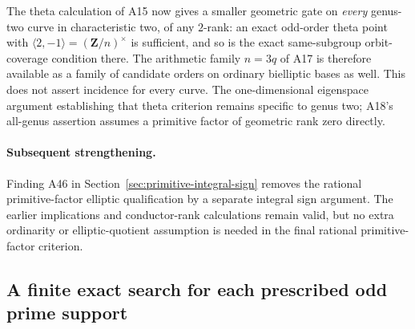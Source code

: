 \documentclass[11pt,a4paper]{article}
\begin{document}
The theta calculation of A15 now gives a smaller geometric
gate on \emph{every} genus-two curve in characteristic two,
of any $2$-rank: an exact odd-order theta point with
$\langle2,-1\rangle=(\mathbf Z/n)^\times$ is sufficient,
and so is the exact same-subgroup orbit-coverage condition
there.  The arithmetic family $n=3q$ of A17 is therefore
available as a family of candidate orders on ordinary
bielliptic bases as well.
This does not assert incidence for every curve.  The
one-dimensional eigenspace argument establishing that
theta criterion remains specific to genus two; A18's
all-genus assertion assumes a primitive factor of geometric
rank zero directly.

\paragraph{Subsequent strengthening.}
Finding A46 in Section~\ref{sec:primitive-integral-sign} removes the
rational primitive-factor elliptic qualification by a separate integral
sign argument. The earlier implications and conductor-rank calculations
remain valid, but no extra ordinarity or elliptic-quotient assumption
is needed in the final rational primitive-factor criterion.


\subsection{A finite exact search for each prescribed odd prime support}
\label{sec:finite-support-theta}
\end{document}
